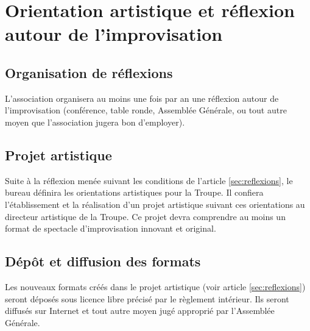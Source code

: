 \documentclass[a4paper,french,10pt]{article}
\newcommand{\article}[1]{\subsection{#1}\addtocounter{article}{1}}
\newcounter{article}
\newcommand{\artref}[1]{article \ref{#1}}
\begin{document}
\section{Orientation artistique et réflexion autour de l'improvisation}
\article{Organisation de réflexions}
\label{sec:reflexions}
L'association organisera au moins une fois par an une réflexion autour
de l'improvisation (conférence, table ronde, Assemblée Générale, ou
tout autre moyen que l'association jugera bon d'employer).


\article{Projet artistique}
\label{sec:projet}
Suite à la réflexion menée suivant les conditions de l'\artref{sec:reflexions}, le bureau définira les orientations artistiques pour la Troupe. Il confiera l'établissement et la réalisation d'un projet artistique suivant ces orientations au directeur artistique de la Troupe. Ce projet devra comprendre au moins un format de spectacle d'improvisation innovant et original.





\article{Dépôt et diffusion des formats}
\label{sec:depot-et-diffusion}
Les nouveaux formats créés dans le projet artistique (voir
\artref{sec:reflexions}) seront déposés sous licence libre précisé par le règlement intérieur. Ils seront diffusés sur Internet et tout autre moyen jugé approprié par l'Assemblée Générale.
\end{document}

